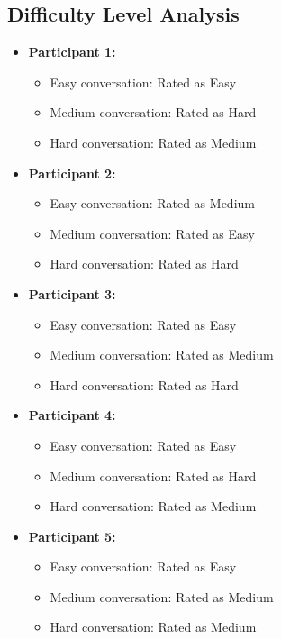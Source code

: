 \documentclass{article}
\begin{document}
\subsection{Difficulty Level Analysis}
\begin{itemize}
    \item \textbf{Participant 1:}
    \begin{itemize}
        \item Easy conversation: Rated as Easy
        \item Medium conversation: Rated as Hard
        \item Hard conversation: Rated as Medium
    \end{itemize}
    \item \textbf{Participant 2:}
    \begin{itemize}
        \item Easy conversation: Rated as Medium
        \item Medium conversation: Rated as Easy
        \item Hard conversation: Rated as Hard
    \end{itemize}
    \item \textbf{Participant 3:}
    \begin{itemize}
        \item Easy conversation: Rated as Easy
        \item Medium conversation: Rated as Medium
        \item Hard conversation: Rated as Hard
    \end{itemize}
    \item \textbf{Participant 4:}
    \begin{itemize}
        \item Easy conversation: Rated as Easy
        \item Medium conversation: Rated as Hard
        \item Hard conversation: Rated as Medium
    \end{itemize}
        \item \textbf{Participant 5:}
    \begin{itemize}
        \item Easy conversation: Rated as Easy
        \item Medium conversation: Rated as Medium
        \item Hard conversation: Rated as Medium
    \end{itemize}
\end{itemize}
\end{document}
